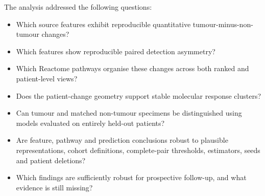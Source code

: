 The analysis addressed the following questions:

\begin{itemize}
\item Which source features exhibit reproducible quantitative tumour-minus-non-tumour changes?
\item Which features show reproducible paired detection asymmetry?
\item Which Reactome pathways organise these changes across both ranked and patient-level views?
\item Does the patient-change geometry support stable molecular response clusters?
\item Can tumour and matched non-tumour specimens be distinguished using models evaluated on entirely held-out patients?
\item Are feature, pathway and prediction conclusions robust to plausible representations, cohort definitions, complete-pair thresholds, estimators, seeds and patient deletions?
\item Which findings are sufficiently robust for prospective follow-up, and what evidence is still missing?
\end{itemize}
